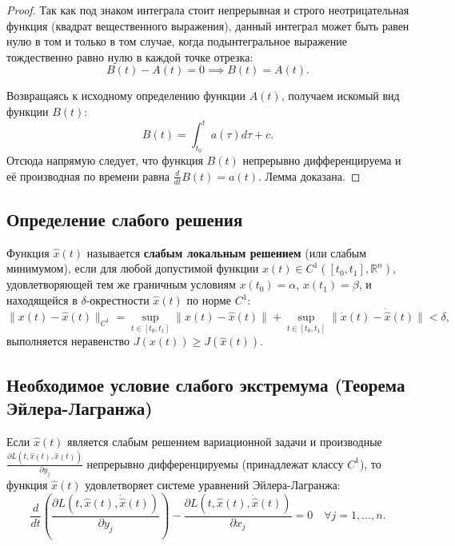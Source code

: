 \begin{proof}
Так как под знаком интеграла стоит непрерывная и строго неотрицательная функция (квадрат вещественного выражения), 
данный интеграл может быть равен нулю в том и только в том случае, когда подынтегральное выражение тождественно равно нулю в каждой точке отрезка:
\begin{equation}
    B(t) - A(t) = 0 \implies B(t) = A(t).
\end{equation}

Возвращаясь к исходному определению функции $A(t)$, получаем искомый вид функции $B(t)$:
\begin{equation}
    B(t) = \int_{t_0}^t a(\tau) d\tau + c.
\end{equation}
Отсюда напрямую следует, что функция $B(t)$ непрерывно дифференцируема и её производная по времени равна $\frac{d}{dt}B(t) = a(t)$. Лемма доказана.
\end{proof}

\subsection{Определение слабого решения}
\begin{definition}
    Функция $\hat{x}(t)$ называется \textbf{слабым локальным решением} (или слабым минимумом), 
    если для любой допустимой функции $x(t) \in C^1([t_0, t_1], \mathbb{R}^n)$, удовлетворяющей тем же граничным условиям $x(t_0) = \alpha$, $x(t_1) = \beta$,
    и находящейся в $\delta$-окрестности $\hat{x}(t)$ по норме $C^1$:
    \begin{equation}
        \|x(t) - \hat{x}(t)\|_{C^1} = \sup_{t \in [t_0, t_1]} \|x(t) - \hat{x}(t)\| + \sup_{t \in [t_0, t_1]} \|\dot{x}(t) - \dot{\hat{x}}(t)\| < \delta,
    \end{equation}
    выполняется неравенство $J(x(t)) \ge J(\hat{x}(t))$.
\end{definition}

\subsection{Необходимое условие слабого экстремума (Теорема Эйлера-Лагранжа)}
\begin{theorem}
    Если $\hat{x}(t)$ является слабым решением вариационной задачи и производные
    $\frac{\partial L(t, \hat{x}(t), \dot{\hat{x}}(t))}{\partial y_j}$ непрерывно дифференцируемы 
    (принадлежат классу $C^1$), то функция $\hat{x}(t)$ удовлетворяет системе уравнений Эйлера-Лагранжа:
    \begin{equation}
        \frac{d}{dt}\left( \frac{\partial L(t, \hat{x}(t), \dot{\hat{x}}(t))}{\partial y_j} \right) - \frac{\partial L(t, \hat{x}(t), \dot{\hat{x}}(t))}{\partial x_j} = 0 \quad \forall j = 1, \dots, n.
    \end{equation}
\end{theorem}

